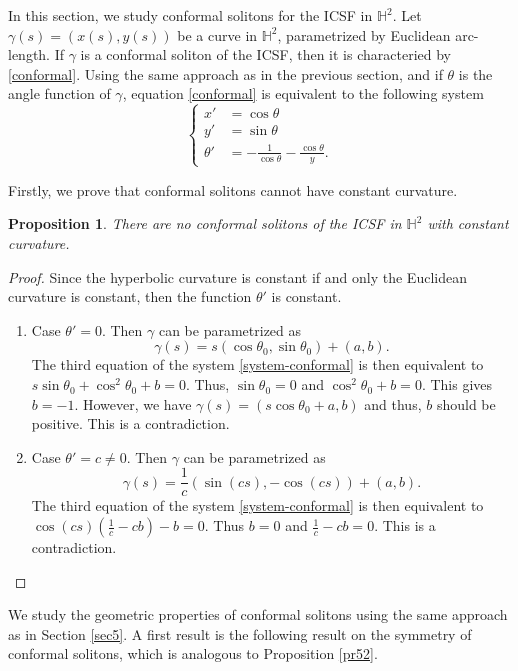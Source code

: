 \documentclass[12pt]{amsart}
\theoremstyle{plain}
\newtheorem{proposition}[theorem]{Proposition}
\theoremstyle{definition}
\def\h{\mathbb H}
\begin{document}
In this section, we study conformal solitons for the ICSF in $\h^2$. Let $\gamma(s) = (x(s), y(s))$ be a curve in $\h^2$, parametrized by Euclidean arc-length. If $\gamma$ is a conformal soliton of the ICSF, then it is characteried by \eqref{conformal}. Using the same approach as in the previous section, and if $\theta$ is the angle function of $\gamma$, equation \eqref{conformal} is equivalent to the following system
\begin{equation}\label{system-conformal}
\left\{\begin{split}
x'&=\cos\theta\\
y'&=\sin\theta\\
\theta'&=-\frac{1}{\cos\theta}-\frac{\cos\theta}{y}.
\end{split}
\right.
\end{equation}

Firstly, we prove that conformal solitons cannot have constant curvature.

\begin{proposition}
   There are no conformal solitons of the ICSF in $\h^2$ with constant curvature.
\end{proposition}

\begin{proof}
   Since the hyperbolic curvature is constant if and only the Euclidean curvature is constant, then the function $\theta'$ is constant.  
   \begin{enumerate}
       \item Case $\theta' = 0$. Then $\gamma$ can be  parametrized as 
       $$\gamma(s) = s   (\cos\theta_0, \sin\theta_0) + (a,b).$$ 
	   The third equation of the system \eqref{system-conformal} is then equivalent to $s   \sin\theta_0 + \cos^2\theta_0 + b=0$. Thus,  	         $\sin\theta_0 = 0$ and $ \cos^2\theta_0 + b = 0$. This gives $b=-1$. However, we have  $\gamma(s)=(s\cos\theta_0+a,b)$ and thus, $b$ should be positive. This is a contradiction.  

       \item Case $\theta' = c \neq 0$. Then $\gamma$ can be  parametrized as $$\gamma(s) = \frac{1}{c} (\sin(cs), -\cos(cs)) + (a, b).$$
	   The third equation of the system \eqref{system-conformal} is then equivalent to  $ \cos(cs)    ( \frac{1}{c} - cb  ) - b=0$. Thus $b=0$ and $\frac{1}{c}-cb=0$. This is a contradiction.  
   \end{enumerate}
\end{proof}

We   study the geometric properties of conformal solitons  using the same approach as in Section \ref{sec5}. A first result is   the following result on the symmetry of conformal solitons, which is analogous to Proposition \ref{pr52}.
\end{document}
